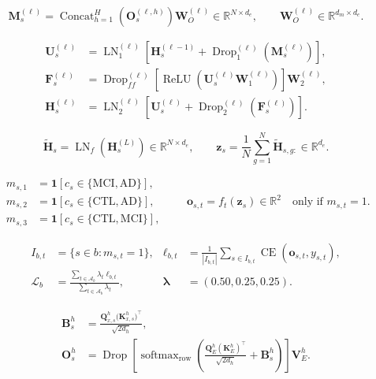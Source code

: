\documentclass[12pt]{article}
\begin{document}
\newpage

\[
\bm M_s^{(\ell)}
=\operatorname{Concat}_{h=1}^{H}\!\left(\bm O_s^{(\ell,h)}\right)
\bm W_O^{(\ell)}
\in\mathbb R^{N\times d_e},
\qquad
\bm W_O^{(\ell)}\in\mathbb R^{d_m\times d_e}.
\]

\newpage

\[
\begin{aligned}
\bm U_s^{(\ell)}
&=\operatorname{LN}_1^{(\ell)}\!\left[
\bm H_s^{(\ell-1)}+\operatorname{Drop}_1^{(\ell)}\!\left(\bm M_s^{(\ell)}\right)
\right],\\[1mm]
\bm F_s^{(\ell)}
&=\operatorname{Drop}_{ff}^{(\ell)}\!\left[
\operatorname{ReLU}\!\left(\bm U_s^{(\ell)}\bm W_1^{(\ell)}\right)
\right]\bm W_2^{(\ell)},\\[1mm]
\bm H_s^{(\ell)}
&=\operatorname{LN}_2^{(\ell)}\!\left[
\bm U_s^{(\ell)}+\operatorname{Drop}_2^{(\ell)}\!\left(\bm F_s^{(\ell)}\right)
\right].
\end{aligned}
\]

\newpage

\[
\widetilde{\bm H}_s
=\operatorname{LN}_{f}\!\left(\bm H_s^{(L)}\right)
\in\mathbb R^{N\times d_e},
\qquad
\bm z_s
=\frac{1}{N}\sum_{g=1}^{N}\widetilde{\bm H}_{s,g:}
\in\mathbb R^{d_e}.
\]

\newpage

\[
\begin{aligned}
m_{s,1}&=\mathbf 1[c_s\in\{\mathrm{MCI},\mathrm{AD}\}],\\
m_{s,2}&=\mathbf 1[c_s\in\{\mathrm{CTL},\mathrm{AD}\}],\\
m_{s,3}&=\mathbf 1[c_s\in\{\mathrm{CTL},\mathrm{MCI}\}],
\end{aligned}
\qquad
\bm o_{s,t}=f_t(\bm z_s)\in\mathbb R^2
\quad\text{only if }m_{s,t}=1.
\]

\newpage

\[
\begin{aligned}
I_{b,t}&=\{s\in b:m_{s,t}=1\},
&\ell_{b,t}&=\frac{1}{|I_{b,t}|}\sum_{s\in I_{b,t}}
\operatorname{CE}(\bm o_{s,t},y_{s,t}),\\[1mm]
\mathcal L_b
&=\frac{\sum_{t\in\mathcal A_b}\lambda_t\ell_{b,t}}
{\sum_{t\in\mathcal A_b}\lambda_t},
&\bm\lambda&=(0.50,0.25,0.25).
\end{aligned}
\]

\newpage

\[
\boxed{
\begin{aligned}
\bm B_s^h
&=\frac{\bm Q_{x,s}^{h}\bigl(\bm K_{x,s}^{h}\bigr)^{\!\top}}{\sqrt{2d_h}},\\[-1mm]
\bm O_s^h
&=\operatorname{Drop}\!\left[
\operatorname{softmax}_{\mathrm{row}}\!\left(
\frac{\bm Q_E^h(\bm K_E^h)^{\!\top}}{\sqrt{2d_h}}+\bm B_s^h
\right)\right]\bm V_E^h.
\end{aligned}}
\]
\end{document}
